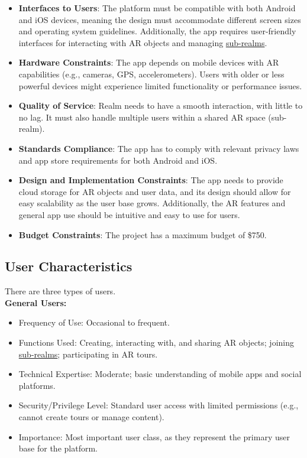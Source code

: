 \documentclass{article}
\begin{document}
\begin{itemize}
    \item \textbf{Interfaces to Users}: The platform must be compatible with both Android and iOS devices, meaning the design must accommodate different screen sizes and operating system guidelines. Additionally, the app requires user-friendly interfaces for interacting with AR objects and managing \hyperref[def:sub_realm]{sub-realms}.

    \item \textbf{Hardware Constraints}: The app depends on mobile devices with AR capabilities (e.g., cameras, GPS, accelerometers). Users with older or less powerful devices might experience limited functionality or performance issues.

    \item \textbf{Quality of Service}: Realm needs to have a smooth interaction, with little to no lag. It must also handle multiple users within a shared AR space (sub-realm).

    \item \textbf{Standards Compliance}: The app has to comply with relevant privacy laws and app store requirements for both Android and iOS.

    \item \textbf{Design and Implementation Constraints}: The app needs to provide cloud storage for AR objects and user data, and its design should allow for easy scalability as the user base grows. Additionally, the AR features and general app use should be intuitive and easy to use for users.

    \item \textbf{Budget Constraints}: The project has a maximum budget of \$750.
\end{itemize}

\subsection{User Characteristics}

There are three types of users.\\

\textbf{General Users:}
\begin{itemize}
    \item Frequency of Use: Occasional to frequent.
    \item Functions Used: Creating, interacting with, and sharing AR objects; joining \hyperref[def:sub_realm]{sub-realms}; participating in AR tours.
    \item Technical Expertise: Moderate; basic understanding of mobile apps and social platforms.
    \item Security/Privilege Level: Standard user access with limited permissions (e.g., cannot create tours or manage content).
    \item Importance: Most important user class, as they represent the primary user base for the platform.
\end{itemize}
\end{document}
